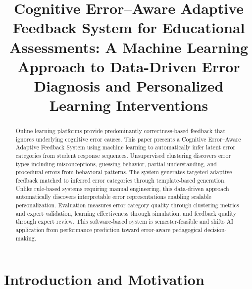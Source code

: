 \documentclass[conference]{IEEEtran}
\begin{document}
\title{Cognitive Error--Aware Adaptive Feedback System for Educational Assessments: A Machine Learning Approach to Data-Driven Error Diagnosis and Personalized Learning Interventions}

\author{
}

\maketitle

\begin{abstract}
Online learning platforms provide predominantly correctness-based feedback that ignores underlying cognitive error causes. This paper presents a Cognitive Error--Aware Adaptive Feedback System using machine learning to automatically infer latent error categories from student response sequences. Unsupervised clustering discovers error types including misconceptions, guessing behavior, partial understanding, and procedural errors from behavioral patterns. The system generates targeted adaptive feedback matched to inferred error categories through template-based generation. Unlike rule-based systems requiring manual engineering, this data-driven approach automatically discovers interpretable error representations enabling scalable personalization. Evaluation measures error category quality through clustering metrics and expert validation, learning effectiveness through simulation, and feedback quality through expert review. This software-based system is semester-feasible and shifts AI application from performance prediction toward error-aware pedagogical decision-making.
\end{abstract}

\section{Introduction and Motivation}
\end{document}
